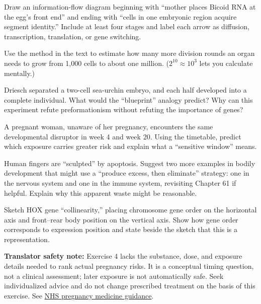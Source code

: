 \begin{sikaoti}
\item Draw an information-flow diagram beginning with ``mother places Bicoid RNA at the egg's front end'' and ending with ``cells in one embryonic region acquire segment identity.'' Include at least four stages and label each arrow as diffusion, transcription, translation, or gene switching.
\item Use the method in the text to estimate how many more division rounds an organ needs to grow from 1,000 cells to about one million. ($2^{10} \approx 10^{3}$ lets you calculate mentally.)
\item Driesch separated a two-cell sea-urchin embryo, and each half developed into a complete individual. What would the ``blueprint'' analogy predict? Why can this experiment refute preformationism without refuting the importance of genes?
\item A pregnant woman, unaware of her pregnancy, encounters the same developmental disruptor in week 4 and week 20. Using the timetable, predict which exposure carries greater risk and explain what a ``sensitive window'' means.
\item Human fingers are ``sculpted'' by apoptosis. Suggest two more examples in bodily development that might use a ``produce excess, then eliminate'' strategy: one in the nervous system and one in the immune system, revisiting Chapter 61 if helpful. Explain why this apparent waste might be reasonable.
\item Sketch HOX gene ``collinearity,'' placing chromosome gene order on the horizontal axis and front--rear body position on the vertical axis. Show how gene order corresponds to expression position and state beside the sketch that this is a representation.
\end{sikaoti}

\textbf{Translator safety note:} Exercise 4 lacks the substance, dose, and exposure details needed to rank actual pregnancy risks. It is a conceptual timing question, not a clinical assessment; later exposure is not automatically safe. Seek individualized advice and do not change prescribed treatment on the basis of this exercise. See \href{https://www.nhs.uk/pregnancy/keeping-well/medicines/}{NHS pregnancy medicine guidance}.
